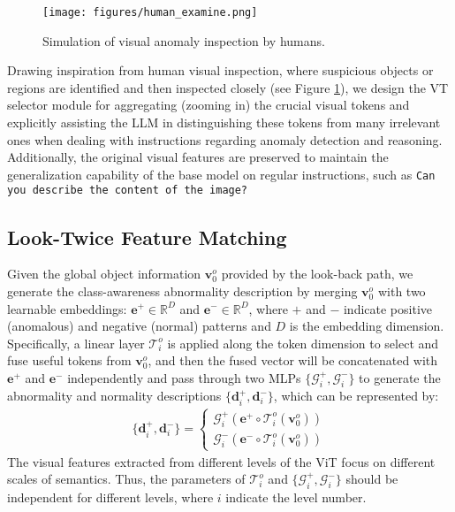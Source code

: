 \begin{figure}[t]
\centering
    \texttt{[image: figures/human\_examine.png]}
\caption{Simulation of visual anomaly inspection by humans.}
\label{fig:human}
\vspace{-4mm}
\end{figure}
Drawing inspiration from human visual inspection, where suspicious objects or regions are identified and then inspected closely (see Figure \ref{fig:human}), we design the VT selector module for aggregating (zooming in) the crucial visual tokens and explicitly assisting the LLM in distinguishing these tokens from many irrelevant ones when dealing with instructions regarding anomaly detection and reasoning. Additionally, the original visual features are preserved to maintain the generalization capability of the base model on regular instructions, such as \texttt{Can you describe the content of the image?}



\subsection{Look-Twice Feature Matching}
\label{ltfm}
Given the global object information $\mathbf{v}^{o}_{0}$ provided by the look-back path, we generate the class-awareness abnormality description by merging $\mathbf{v}^{o}_{0}$ with two learnable embeddings: $\mathbf{e}^{+}\in \mathbb{R}^{D}$ and $\mathbf{e}^{-}\in \mathbb{R}^{D}$, where $+$ and $-$ indicate positive (anomalous) and negative (normal) patterns and $D$ is the embedding dimension. Specifically, a linear layer $\mathcal{T}^{o}_{i}$ is applied along the token dimension to select and fuse useful tokens from $\mathbf{v}^{o}_{0}$, and then the fused vector will be concatenated with $\mathbf{e}^{+}$ and $\mathbf{e}^{-}$ independently and pass through two MLPs $\{\mathcal{G}^{+}_{i}, \mathcal{G}^{-}_{i}\}$ to generate the abnormality and normality descriptions $\{\mathbf{d}^{+}_{i}, \mathbf{d}^{-}_{i}\}$, which can be represented by:
\begin{align}
\{\mathbf{d}^{+}_{i}, \mathbf{d}^{-}_{i}\} = 
\begin{cases}
\mathcal{G}^{+}_{i}(\mathbf{e}^{+} \circ \mathcal{T}^{o}_{i}(\mathbf{v}^{o}_{0})) \\
\mathcal{G}^{-}_{i}(\mathbf{e}^{-} \circ \mathcal{T}^{o}_{i}(\mathbf{v}^{o}_{0}))
\end{cases}
\end{align}
The visual features extracted from different levels of the ViT focus on different scales of semantics. Thus, the parameters of $\mathcal{T}^{o}_{i}$ and $\{\mathcal{G}^{+}_{i}, \mathcal{G}^{-}_{i}\}$ should be independent for different levels, where $i$ indicate the level number. 

